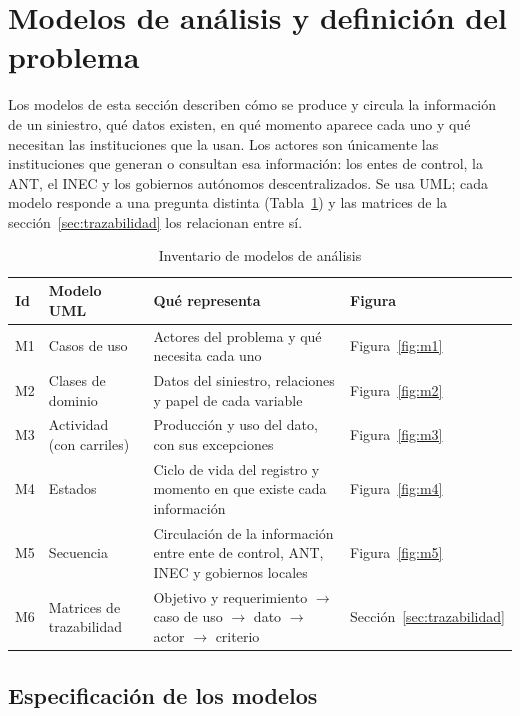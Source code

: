 \section{Modelos de análisis y definición del problema}

Los modelos de esta sección describen cómo se produce y circula la información de un siniestro, qué datos existen, en qué momento aparece cada uno y qué necesitan las instituciones que la usan. Los actores son únicamente las instituciones que generan o consultan esa información: los entes de control, la ANT, el INEC y los gobiernos autónomos descentralizados. Se usa UML; cada modelo responde a una pregunta distinta (Tabla~\ref{tab:modelos}) y las matrices de la sección~\ref{sec:trazabilidad} los relacionan entre sí.

\begin{table}[htbp]
\centering
\small
\caption{Inventario de modelos de análisis}
\label{tab:modelos}
\begin{tabularx}{\textwidth}{l l X l}
\toprule
Id & Modelo UML & Qué representa & Figura \\
\midrule
M1 & Casos de uso & Actores del problema y qué necesita cada uno & Figura~\ref{fig:m1} \\
M2 & Clases de dominio & Datos del siniestro, relaciones y papel de cada variable & Figura~\ref{fig:m2} \\
M3 & Actividad (con carriles) & Producción y uso del dato, con sus excepciones & Figura~\ref{fig:m3} \\
M4 & Estados & Ciclo de vida del registro y momento en que existe cada información & Figura~\ref{fig:m4} \\
M5 & Secuencia & Circulación de la información entre ente de control, ANT, INEC y gobiernos locales & Figura~\ref{fig:m5} \\
M6 & Matrices de trazabilidad & Objetivo y requerimiento $\rightarrow$ caso de uso $\rightarrow$ dato $\rightarrow$ actor $\rightarrow$ criterio & Sección~\ref{sec:trazabilidad} \\
\bottomrule
\end{tabularx}
\end{table}

\subsection{Especificación de los modelos}

